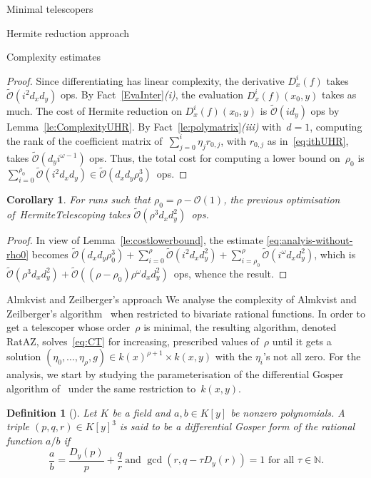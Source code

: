 \documentclass{sig-alt-full}
\newcommand{\bigO}{{\mathcal{O}}}
\newcommand{\bigOsoft}{\tilde{\mathcal{O}}}
\newcommand{\bN}{\mathbb{N}}
\newtheorem{cor}[lemma]{Corollary}
\newtheorem{definition}{Definition} \renewcommand{\thedefinition}{}
\begin{document}
\begin{section}{Minimal telescopers}
\begin{subsection}{Hermite reduction approach}
\begin{subsubsection}{Complexity estimates}
\begin{proof}
Since differentiating has linear complexity, the derivative
$D_x^i(f)$ takes $\bigOsoft(i^2d_xd_y)$ ops.
By Fact~\ref{EvaInter}\emph{(i)}, the evaluation $D_x^i(f)(x_0, y)$
takes as much.
The cost of Hermite reduction
on $D_x^i(f)(x_0, y)$ is $\bigOsoft(id_y)$ ops by
Lemma~\ref{le:ComplexityUHR}.
By Fact~\ref{le:polymatrix}\emph{(iii)\/} with~$d=1$,
computing the rank of the coefficient
matrix of~$\sum_{j=0}^i\eta_j r_{0, j}$, with $r_{0, j}$ as
in~\eqref{eq:ithUHR}, takes $\bigOsoft(d_y i^{\omega-1})$ ops.
Thus, the total cost for computing a lower bound on~$\rho_0$
is $\sum_{i=0}^{\rho_0} \bigOsoft(i^2 d_xd_y)\in
\bigOsoft(d_xd_y\rho_0^3)$~ops.
\end{proof}

\begin{cor}
For runs such that $\rho_0=\rho-\bigO(1)$, the previous optimisation
of~\textsf{HermiteTelescoping} takes
$\bigOsoft(\rho^3d_xd_y^2)$~ops.
\end{cor}
\begin{proof}
In view of Lemma~\ref{le:costlowerbound},
the estimate \eqref{eq:analyis-without-rho0} becomes
$\bigOsoft(d_xd_y\rho_0^3) +
\sum_{i=0}^{\rho} \bigOsoft(i^2d_xd_y^2) +
\sum_{i=\rho_0}^{\rho} \bigOsoft(i^{\omega} d_x d_y^2)$,
which is $\bigOsoft(\rho^3 d_x d_y^2) +
\bigOsoft((\rho-\rho_0)\rho^\omega d_x d_y^2)$~ops,
whence the result.
\end{proof}

\end{subsubsection}
\end{subsection}

\begin{subsection}{Almkvist and Zeilberger's approach}\label{AZA}
We analyse the complexity of Almkvist and Zeilberger's
algorithm~\cite{Almkvist1990} when restricted to bivariate rational
functions.
In order to get a telescoper whose order~$\rho$ is minimal, the resulting
algorithm, denoted \textsf{RatAZ}, solves~\eqref{eq:CT} for
increasing, prescribed values of~$\rho$
until it gets a solution $(\eta_0, \dots, \eta_{\rho}, g)\in
k(x)^{\rho+1}\times k(x, y)$ with the $\eta_i$'s not all zero.
For the analysis, we start by studying the parameterisation of the
differential Gosper algorithm of~\cite{Almkvist1990}
under the same restriction to~$k(x,y)$.

\begin{definition}[\cite{Gerhard2004}]
Let $K$ be a field and $a, b\in K[y]$ be non\-zero polynomials. A
triple $(p, q, r)\in K[y]^3$ is said to be a \emph{differential Gosper
form\/} of the rational function $a/b$ if
\[\frac{a}{b} = \frac{D_y(p)}{p} + \frac{q}{r}~\text{and $\gcd(r,
  q-\tau D_y(r))=1$ for all $\tau\in \bN$}.\]
\end{definition}


\end{subsection}
\end{section}
\end{document}

